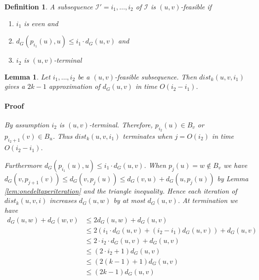 \documentclass[12pt]{article}
\newtheorem{lem}[thm]{Lemma}
\newtheorem{defi}[thm]{Definition}
\begin{document}
\begin{defi}
A subsequence $\mathcal{I'}=i_1, \hdots, i_2$ of $\mathcal{I}$ is $(u,v)$-feasible if
\begin{enumerate}
\item $i_1$ is even and
\item $d_{G}(p_{i_1}(u),u) \leq i_1 \cdot d_G(u,v)$ and
\item $i_2$ is $(u,v)$-terminal
\end{enumerate}
\end{defi}

\begin{lem}
Let $i_1, \hdots, i_2$ be a $(u,v)$-feasible subsequence. Then $dist_k(u,v,i_1)$ gives a $2k-1$ approximation of $d_G(u,v)$ in time $O(i_2-i_1)$.
\paragraph{Proof} By assumption $i_2$ is $(u,v)$-terminal. Therefore, $p_{i_2}(u) \in B_v$ or $p_{i_2 + 1}(v) \in B_u$. Thus $dist_k(u,v,i_1)$ terminates when $j=O(i_2)$ in time $O(i_2-i_1)$.

Furthermore $d_{G}(p_{i_1}(u),u) \leq i_1 \cdot d_G(u,v)$. When $p_j(u) = w \not\in B_v$
we have $d_G(v,p_{j+1}(v)) \leq d_G(v,p_{j}(u)) \leq d_G(v,u) + d_G(u,p_j(u))$ by Lemma \ref{lem:onedeltaperiteration} and the triangle inequality. Hence each iteration of $dist_k(u,v,i)$ increases $d_G(u,w)$ by at most $d_G(u,v)$. At termination we have
\begin{align*}
d_G(u,w) + d_G(w,v) &\leq 2d_G(u,w) + d_G(u,v) \\
&\leq 2(i_1 \cdot d_G(u,v) + (i_2 - i_1)d_G(u,v)) + d_G(u,v) \\
&\leq 2 \cdot i_2 \cdot d_G(u,v) + d_G(u,v) \\
&\leq (2 \cdot i_2 + 1)d_G(u,v) \\
&\leq (2 (k-1) + 1)d_G(u,v) \\
&\leq (2k-1) d_G(u,v)
\end{align*}
\end{lem}


\end{document}
